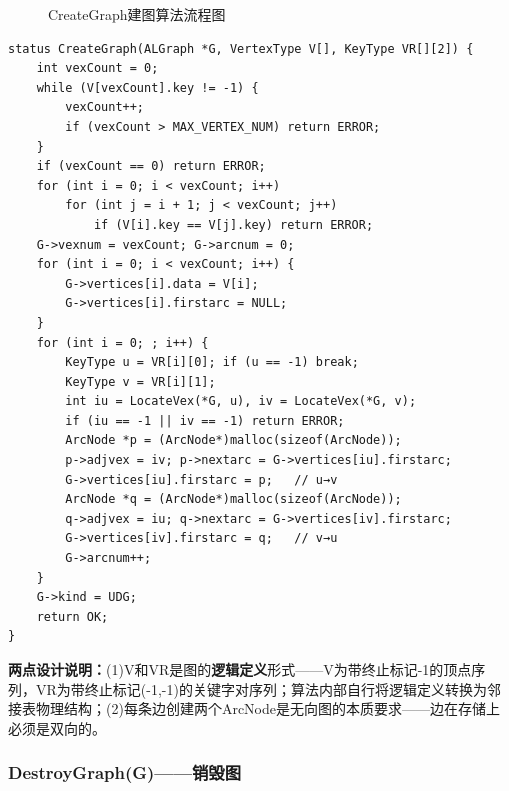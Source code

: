 \documentclass[supercite]{Experimental_Report}
\begin{document}
{\begin{figure}[H]
{
}
\caption{CreateGraph建图算法流程图}
\label{fig:creategraph-flow}
\end{figure}
\newpage
\begin{lstlisting}[label={lst:create-graph}, caption={CreateGraph}]
status CreateGraph(ALGraph *G, VertexType V[], KeyType VR[][2]) {
    int vexCount = 0;
    while (V[vexCount].key != -1) {
        vexCount++;
        if (vexCount > MAX_VERTEX_NUM) return ERROR;
    }
    if (vexCount == 0) return ERROR;
    for (int i = 0; i < vexCount; i++)
        for (int j = i + 1; j < vexCount; j++)
            if (V[i].key == V[j].key) return ERROR;
    G->vexnum = vexCount; G->arcnum = 0;
    for (int i = 0; i < vexCount; i++) {
        G->vertices[i].data = V[i];
        G->vertices[i].firstarc = NULL;
    }
    for (int i = 0; ; i++) {
        KeyType u = VR[i][0]; if (u == -1) break;
        KeyType v = VR[i][1];
        int iu = LocateVex(*G, u), iv = LocateVex(*G, v);
        if (iu == -1 || iv == -1) return ERROR;
        ArcNode *p = (ArcNode*)malloc(sizeof(ArcNode));
        p->adjvex = iv; p->nextarc = G->vertices[iu].firstarc;
        G->vertices[iu].firstarc = p;   // u→v
        ArcNode *q = (ArcNode*)malloc(sizeof(ArcNode));
        q->adjvex = iu; q->nextarc = G->vertices[iv].firstarc;
        G->vertices[iv].firstarc = q;   // v→u
        G->arcnum++;
    }
    G->kind = UDG;
    return OK;
}
\end{lstlisting}

\textbf{两点设计说明：}(1)V和VR是图的\textbf{逻辑定义}形式——V为带终止标记-1的顶点序列，VR为带终止标记(-1,-1)的关键字对序列；算法内部自行将逻辑定义转换为邻接表物理结构；(2)每条边创建两个ArcNode是无向图的本质要求——边在存储上必须是双向的。

\subsubsection{DestroyGraph(G)——销毁图}

}
\end{document}
